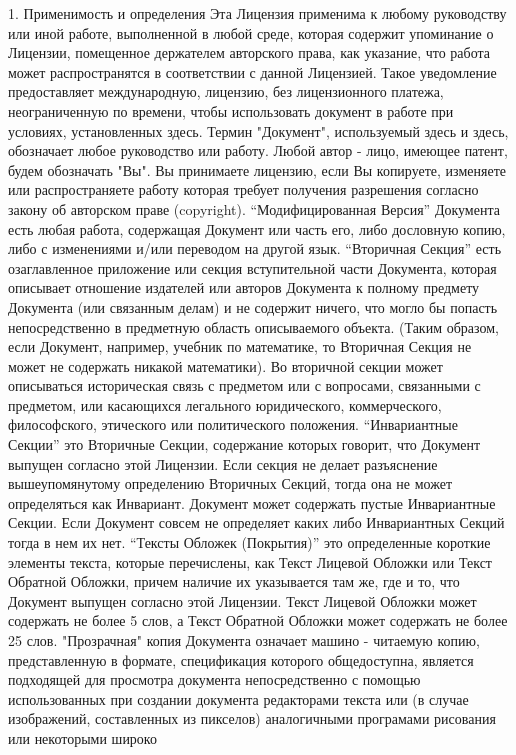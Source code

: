 1. Применимость и определения
Эта Лицензия применима к любому руководству или иной работе, выполненной в любой среде, которая содержит упоминание
 о Лицензии, помещенное держателем авторского права, как указание, что работа может распространятся в соответствии с
 данной Лицензией. Такое уведомление предоставляет международную, лицензию, без лицензионного платежа, неограниченную
 по времени, чтобы использовать документ в работе при условиях, установленных здесь. Термин "Документ", используемый
 здесь и здесь, обозначает любое  руководство или работу.
Любой автор - лицо, имеющее патент, будем обозначать "Вы". Вы принимаете лицензию, если Вы копируете, изменяете или
 распространяете работу которая требует получения разрешения согласно закону об авторском праве (copyright).
“Модифицированная Версия” Документа есть любая работа, содержащая Документ или часть его, либо дословную копию, либо
 с изменениями и/или переводом на другой язык.
“Вторичная Секция” есть озаглавленное приложение или секция вступительной части Документа, которая описывает отношение
 издателей или авторов Документа к полному предмету Документа (или связанным делам) и не содержит ничего, что могло бы
 попасть непосредственно в предметную область описываемого объекта. (Таким образом, если Документ, например, учебник по
 математике, то Вторичная Секция не может не содержать никакой математики). Во вторичной секции может описываться
 историческая связь с предметом или с вопросами, связанными с предметом, или касающихся легального юридического,
 коммерческого, философского, этического или политического положения.
“Инвариантные Секции” это Вторичные Секции, содержание которых говорит, что Документ выпущен согласно этой Лицензии.
 Если секция не делает разъяснение вышеупомянутому определению Вторичных Секций, тогда она не может определяться как
 Инвариант. Документ может содержать пустые Инвариантные Секции. Если Документ совсем не определяет каких либо Инвариантных
 Секций тогда в нем их нет.
“Тексты Обложек (Покрытия)” это определенные короткие элементы текста, которые перечислены, как Текст Лицевой Обложки
 или Текст Обратной Обложки, причем наличие их указывается там же, где и то, что Документ выпущен согласно этой Лицензии.
 Текст Лицевой Обложки может содержать не более 5 слов, а Текст Обратной Обложки может содержать не более 25 слов.
"Прозрачная" копия Документа означает машино - читаемую копию, представленную в формате, спецификация которого общедоступна,
 является подходящей для просмотра документа непосредственно с помощью использованных при создании документа  редакторами
 текста или (в случае изображений, составленных из пикселов) аналогичными програмами рисования или некоторыми широко

